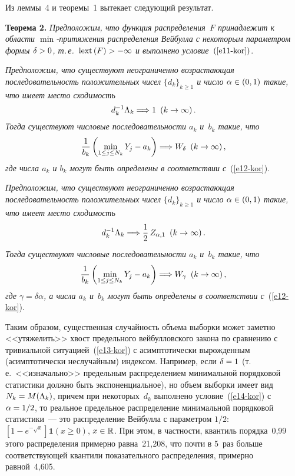 \begin{multicols}{2}
\smallskip

Из леммы~4 и теоремы~1 вытекает следующий результат.

\smallskip

\noindent
\textbf{Теорема 2.} \textit{Предположим, что функция распределения~$F$
принадлежит к области $\min$-при\-тя\-же\-ния распределения Вейбулла с
некоторым параметром формы $\delta\hm>0$, т.\,е.\ $\mathrm{lext}\,(F)\hm>-\infty$
и выполнено условие~$(\ref{e11-kor})$}.

\textit{Предположим, что существуют неограниченно
возрастающая после\-до\-ва\-тель\-ность положительных чисел
$\{d_k\}_{k\ge1}$ и число $\alpha\hm\in(0,1)$ такие, что имеет место
сходимость}
\begin{equation}
d_k^{-1}\Lambda_k\Longrightarrow 1\enskip (k\to\infty)\,.\label{e13-kor}
\end{equation}
\textit{Тогда существуют числовые последовательности $a_k$ и~$b_k$
такие, что}
$$
\displaystyle\frac{\displaystyle 1\mathstrut}{\displaystyle b_k\mathstrut}\left(\min_{1\le j\le N_k}Y_j-a_k\right)\Longrightarrow
W_{\delta}\enskip (k\to\infty)\,,
$$
\textit{где числа $a_k$ и $b_k$ могут быть определены в соответствии с}~(\ref{e12-kor}).

 \textit{Предположим, что существуют неограниченно
возрастающая после\-до\-ва\-тель\-ность положительных чисел
$\{d_k\}_{k\ge1}$ и число $\alpha\hm\in(0,1)$ такие, что имеет место
сходимость}
\begin{equation}
d_k^{-1}\Lambda_k\Longrightarrow \displaystyle\frac{\displaystyle 1\mathstrut}{\displaystyle 2\mathstrut}\,Z_{\alpha,1}\enskip
(k\to\infty)\,. \label{e14-kor}
\end{equation}
\textit{Тогда существуют числовые последовательности $a_k$ и~$b_k$
такие, что}
$$
\displaystyle\frac{\displaystyle 1\mathstrut}{\displaystyle b_k\mathstrut}\left(\min_{1\le j\le N_k}Y_j-a_k\right)\Longrightarrow
W_{\gamma}\enskip (k\to\infty)\,,
$$
\textit{где $\gamma=\delta\alpha$, а числа $a_k$ и~$b_k$ могут быть
определены в соответствии с}~(\ref{e12-kor}).

\smallskip

Таким образом, существенная случайность объема выборки может заметно
<<утяжелить>> хвост предельного вейбулловского закона по сравнению с
тривиальной ситуацией~(\ref{e13-kor}) с асимптотически вырожденным
(асимптотически неслучайным) индексом. Например, если $\delta\hm=1$ (т.\,е.\
 <<изначально>> предельным распределением минимальной порядковой
статистики должно быть экспоненциальное), но объем выборки имеет вид
$N_k\hm=M(\Lambda_k)$, причем при некоторых~$d_k$ выполнено условие~(\ref{e14-kor})
с $\alpha\hm=1/2$, то реальное предельное распределение
минимальной порядковой статистики~--- это распределение Вейбулла с
параметром $1/2$: $[1-e^{-\sqrt{x}}]\mathbf{1}(x\ge0)$,
$x\hm\in\mathbb{R}$. При этом, в част\-ности, квантиль порядка~0,99 этого
распределения примерно равна~21,208, что почти в 5~раз больше
соответствующей квантили показательного распределения, примерно
равной~4,605.


\end{multicols}
